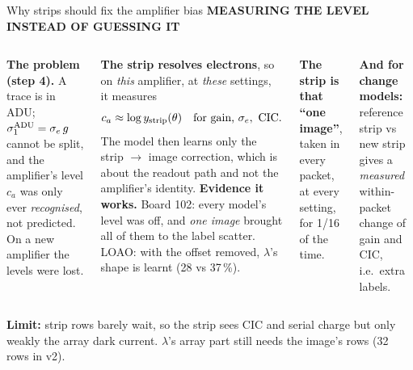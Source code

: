 \documentclass[aspectratio=169,11pt]{beamer}
\newcommand{\eyebrow}[2][trace]{{\color{#1}\scriptsize\bfseries\MakeUppercase{#2}}\par\vspace{0.1em}}
\newcommand{\warnbox}[1]{\par\vspace{0.3em}\colorbox{problem!10}{\parbox{0.975\textwidth}{\scriptsize #1}}}
\begin{document}
\begin{frame}{Why strips should fix the amplifier bias}
\eyebrow[image]{Measuring the level instead of guessing it}
\begin{columns}[T]
\small
\textbf{The problem (step 4).} A trace is in ADU; $\sigma_1^{\rm ADU}=\sigma_e\,g$ cannot be split, and the amplifier's level $c_a$ was only ever \emph{recognised}, not predicted. On a new amplifier the levels were lost.\par\medskip
\textbf{The strip resolves electrons}, so on \emph{this} amplifier, at \emph{these} settings, it measures
\[c_a\approx\log y_{\rm strip}(\theta)\quad\text{for gain, }\sigma_e,\ \text{CIC}.\]
The model then learns only the strip $\to$ image correction, which is about the readout path and not the amplifier's identity.
\small
\textbf{Evidence it works.} Board 102: every model's level was off, and \emph{one image} brought all of them to the label scatter. LOAO: with the offset removed, $\lambda$'s shape is learnt (28 vs 37\,\%).\par\medskip
\textbf{The strip is that ``one image''}, taken in every packet, at every setting, for 1/16 of the time.\par\medskip
\textbf{And for change models:} reference strip vs new strip gives a \emph{measured} within-packet change of gain and CIC, i.e.\ extra labels.
\end{columns}
\warnbox{\textbf{Limit:} strip rows barely wait, so the strip sees CIC and serial charge but only weakly the array dark current. $\lambda$'s array part still needs the image's rows (32 rows in v2).}
\end{frame}
\end{document}
